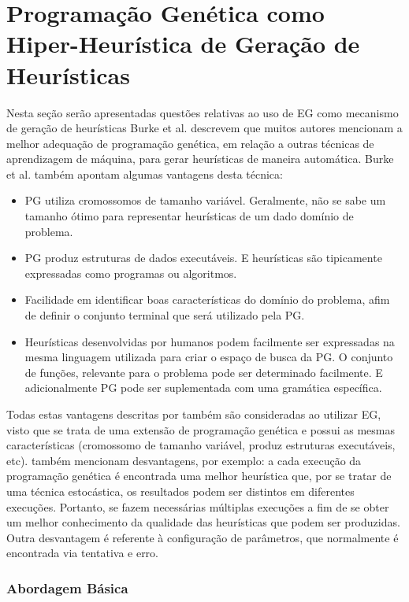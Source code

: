 \section{Programação Genética como Hiper-Heurística de Geração de Heurísticas}
\label{subsubsection:PGasHH}

Nesta seção serão apresentadas questões relativas ao uso de EG como mecanismo de geração de heurísticas Burke et al. \cite{burke2009exploring} descrevem que muitos autores mencionam a melhor adequação de programação genética, em relação a outras técnicas de aprendizagem de máquina, para gerar heurísticas de maneira automática. Burke et al. também apontam algumas vantagens desta técnica:

\begin{itemize}
	\item PG utiliza cromossomos de tamanho variável. Geralmente, não se sabe um tamanho ótimo para representar heurísticas de um dado domínio de problema.
	\item PG produz estruturas de dados executáveis. E heurísticas são tipicamente expressadas como programas ou algoritmos.
	\item Facilidade em identificar boas características do domínio do problema, afim de definir o conjunto terminal que será utilizado pela PG.
	\item Heurísticas desenvolvidas por humanos podem facilmente ser expressadas na mesma linguagem utilizada para criar o espaço de busca da PG. O conjunto de funções, relevante para o problema pode ser determinado facilmente. E adicionalmente PG pode ser suplementada com uma gramática específica.
\end{itemize}

Todas estas vantagens descritas por \cite{burke2009exploring} também são consideradas ao utilizar EG, visto que se trata de uma extensão de programação genética e possui as mesmas características (cromossomo de tamanho variável, produz estruturas executáveis, etc). \cite{burke2009exploring} também mencionam desvantagens, por exemplo: a cada execução da programação genética é encontrada uma melhor heurística que, por se tratar de uma técnica estocástica, os resultados podem ser distintos em diferentes execuções. Portanto, se fazem necessárias múltiplas execuções a fim de se obter um melhor conhecimento da qualidade das heurísticas que podem ser produzidas. Outra desvantagem é referente à configuração de parâmetros, que normalmente é encontrada via tentativa e erro.

\subsubsection{Abordagem Básica}

